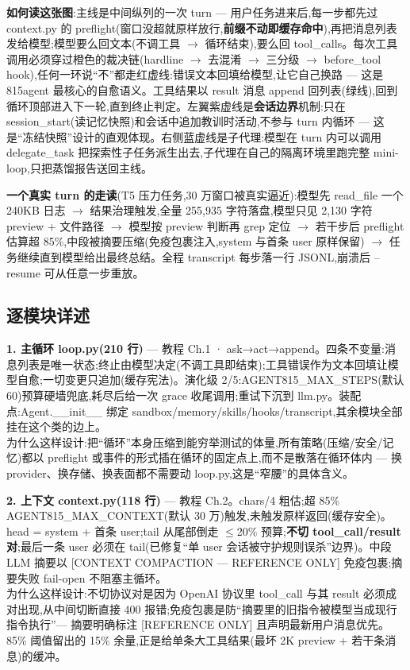 \documentclass[10pt,a4paper]{article}
\renewcommand{\footnotesize}{\fontsize{7.5}{10.5}\selectfont}
\newcommand{\lv}[2]{\textcolor{#1}{\textbf{\footnotesize[#2]}}}
\begin{document}
\textbf{如何读这张图}:主线是中间纵列的一次 turn --- 用户任务进来后,每一步都先过 context.py 的 preflight(窗口没超就原样放行,\textbf{前缀不动即缓存命中}),再把消息列表发给模型;模型要么回文本(不调工具 $\to$ 循环结束),要么回 tool\_calls。每次工具调用必须穿过橙色的裁决链(hardline $\to$ 去混淆 $\to$ 三分级 $\to$ before\_tool hook),任何一环说``不''都走红虚线:错误文本回填给模型,让它自己换路 --- 这是 815agent 最核心的自愈语义。工具结果以 result 消息 append 回列表(绿线),回到循环顶部进入下一轮,直到终止判定。左翼紫虚线是\textbf{会话边界}机制:只在 session\_start(读记忆快照)和会话中追加教训时活动,不参与 turn 内循环 --- 这是``冻结快照''设计的直观体现。右侧蓝虚线是子代理:模型在 turn 内可以调用 delegate\_task 把探索性子任务派生出去,子代理在自己的隔离环境里跑完整 mini-loop,只把蒸馏报告送回主线。

\textbf{一个真实 turn 的走读}(T5 压力任务,30 万窗口被真实逼近):模型先 read\_file 一个 240KB 日志 $\to$ 结果治理触发,全量 255,935 字符落盘,模型只见 2,130 字符 preview + 文件路径 $\to$ 模型按 preview 判断再 grep 定位 $\to$ 若干步后 preflight 估算超 85\%,中段被摘要压缩(免疫包裹注入,system 与首条 user 原样保留) $\to$ 任务继续直到模型给出最终总结。全程 transcript 每步落一行 JSONL,崩溃后 --resume 可从任意一步重放。

\subsection{逐模块详述}

\textbf{1. 主循环 loop.py(210 行)\lv{okc}{L2}} --- 教程 Ch.1 · ask→act→append。四条不变量:消息列表是唯一状态;终止由模型决定(不调工具即结束);工具错误作为文本回填让模型自愈;一切变更只追加(缓存宪法)。演化级 2/5:AGENT815\_MAX\_STEPS(默认 60)预算硬墙兜底,耗尽后给一次 grace 收尾调用;重试下沉到 llm.py。装配点:Agent.\_\_init\_\_ 绑定 sandbox/memory/skills/hooks/transcript,其余模块全部挂在这个类的边上。\\
{\color{dimc}为什么这样设计:}把``循环''本身压缩到能穷举测试的体量,所有策略(压缩/安全/记忆)都以 preflight 或事件的形式插在循环的固定点上,而不是散落在循环体内 --- 换 provider、换存储、换表面都不需要动 loop.py,这是``窄腰''的具体含义。

\textbf{2. 上下文 context.py(118 行)\lv{okc}{L2}} --- 教程 Ch.2。chars/4 粗估;超 85\% AGENT815\_MAX\_CONTEXT(默认 30 万)触发,未触发原样返回(缓存安全)。head = system + 首条 user;tail 从尾部倒走 $\leq$20\% 预算;\textbf{不切 tool\_call/result 对};最后一条 user 必须在 tail(已修复``单 user 会话被守护规则误杀''边界)。中段 LLM 摘要以 [CONTEXT COMPACTION --- REFERENCE ONLY] 免疫包裹;摘要失败 fail-open 不阻塞主循环。\\
{\color{dimc}为什么这样设计:}不切协议对是因为 OpenAI 协议里 tool\_call 与其 result 必须成对出现,从中间切断直接 400 报错;免疫包裹是防``摘要里的旧指令被模型当成现行指令执行''--- 摘要明确标注 [REFERENCE ONLY] 且声明最新用户消息优先。85\% 阈值留出的 15\% 余量,正是给单条大工具结果(最坏 2K preview + 若干条消息)的缓冲。
\end{document}
